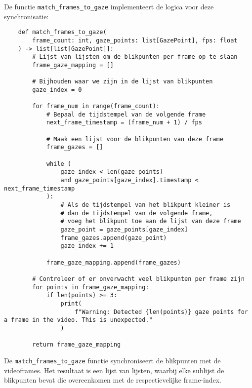 De functie \texttt{match\_frames\_to\_gaze} implementeert de logica voor deze synchronisatie:
\begin{listing}[H]
  \begin{verbatim}
    def match_frames_to_gaze(
        frame_count: int, gaze_points: list[GazePoint], fps: float
    ) -> list[list[GazePoint]]:
        # Lijst van lijsten om de blikpunten per frame op te slaan
        frame_gaze_mapping = []
        
        # Bijhouden waar we zijn in de lijst van blikpunten
        gaze_index = 0

        for frame_num in range(frame_count):
            # Bepaal de tijdstempel van de volgende frame
            next_frame_timestamp = (frame_num + 1) / fps

            # Maak een lijst voor de blikpunten van deze frame
            frame_gazes = []

            while (
                gaze_index < len(gaze_points)
                and gaze_points[gaze_index].timestamp < next_frame_timestamp
            ):
                # Als de tijdstempel van het blikpunt kleiner is 
                # dan de tijdstempel van de volgende frame,
                # voeg het blikpunt toe aan de lijst van deze frame
                gaze_point = gaze_points[gaze_index]
                frame_gazes.append(gaze_point)
                gaze_index += 1

            frame_gaze_mapping.append(frame_gazes)

        # Controleer of er onverwacht veel blikpunten per frame zijn
        for points in frame_gaze_mapping:
            if len(points) >= 3:
                print(
                    f"Warning: Detected {len(points)} gaze points for a frame in the video. This is unexpected."
                )

        return frame_gaze_mapping
  \end{verbatim}
  \caption[\texttt{match\_frames\_to\_gaze} functie]{
    De \texttt{match\_frames\_to\_gaze} functie synchroniseert de blikpunten met de videoframes.
    Het resultaat is een lijst van lijsten, waarbij elke sublijst de blikpunten bevat die overeenkomen met de respectievelijke frame-index.
  }
\end{listing}

